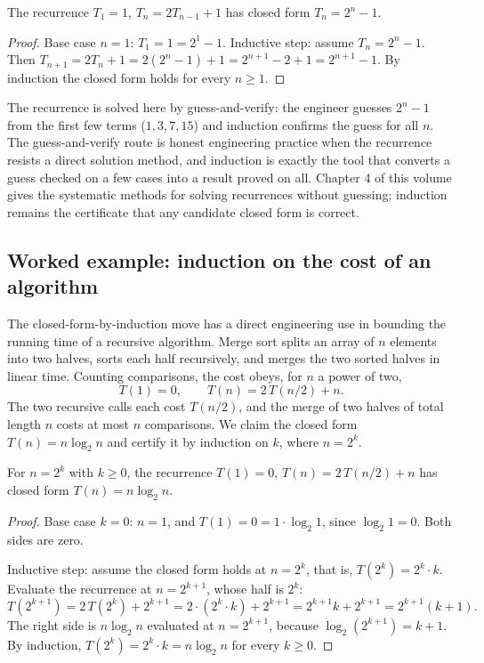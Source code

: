 \begin{theorem}
The recurrence $T_{1} = 1$, $T_{n} = 2 T_{n-1} + 1$ has closed form
$T_{n} = 2^{n} - 1$.
\end{theorem}

\begin{proof}
Base case $n = 1$: $T_{1} = 1 = 2^{1} - 1$. Inductive step: assume
$T_{n} = 2^{n} - 1$. Then $T_{n+1} = 2 T_{n} + 1 = 2(2^{n} - 1) + 1 =
2^{n+1} - 2 + 1 = 2^{n+1} - 1$. By induction the closed form holds for
every $n \geq 1$.
\end{proof}

The recurrence is solved here by guess-and-verify: the engineer guesses
$2^{n} - 1$ from the first few terms ($1, 3, 7, 15$) and induction
confirms the guess for all $n$. The guess-and-verify route is honest
engineering practice when the recurrence resists a direct solution
method, and induction is exactly the tool that converts a guess
checked on a few cases into a result proved on all. Chapter 4 of this
volume gives the systematic methods for solving recurrences without
guessing; induction remains the certificate that any candidate closed
form is correct.

\subsection{Worked example: induction on the cost of an algorithm}

The closed-form-by-induction move has a direct engineering use in
bounding the running time of a recursive algorithm. Merge sort splits an
array of $n$ elements into two halves, sorts each half recursively, and
merges the two sorted halves in linear time. Counting comparisons, the
cost obeys, for $n$ a power of two,
\[
T(1) = 0,
\qquad
T(n) = 2\,T(n/2) + n.
\]
The two recursive calls each cost $T(n/2)$, and the merge of two halves
of total length $n$ costs at most $n$ comparisons. We claim the closed
form $T(n) = n \log_{2} n$ and certify it by induction on $k$, where
$n = 2^{k}$.

\begin{theorem}
For $n = 2^{k}$ with $k \geq 0$, the recurrence $T(1) = 0$, $T(n) =
2\,T(n/2) + n$ has closed form $T(n) = n \log_{2} n$.
\end{theorem}

\begin{proof}
Base case $k = 0$: $n = 1$, and $T(1) = 0 = 1 \cdot \log_{2} 1$, since
$\log_{2} 1 = 0$. Both sides are zero.

Inductive step: assume the closed form holds at $n = 2^{k}$, that is,
$T(2^{k}) = 2^{k} \cdot k$. Evaluate the recurrence at $n = 2^{k+1}$,
whose half is $2^{k}$:
\[
T(2^{k+1}) = 2\,T(2^{k}) + 2^{k+1}
= 2 \cdot (2^{k} \cdot k) + 2^{k+1}
= 2^{k+1} k + 2^{k+1}
= 2^{k+1}(k + 1).
\]
The right side is $n \log_{2} n$ evaluated at $n = 2^{k+1}$, because
$\log_{2}(2^{k+1}) = k + 1$. By induction, $T(2^{k}) = 2^{k} \cdot k =
n \log_{2} n$ for every $k \geq 0$.
\end{proof}

